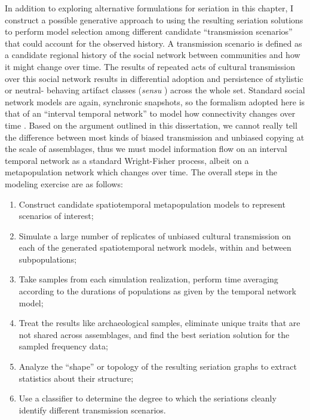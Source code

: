 In addition to exploring alternative formulations for seriation in this chapter, I construct a possible generative approach to using the resulting seriation solutions to perform model selection among different candidate “transmission scenarios” that could account for the observed history.  A transmission scenario is defined as a candidate regional history of the social network between communities and how it might change over time. The results of repeated acts of cultural transmission over this social network results in differential adoption and persistence of stylistic or neutral- behaving artifact classes (\emph{sensu} \citealt{Dunnell1978}) across the whole set. Standard social network models are again, synchronic snapshots, so the formalism adopted here is that of an “interval temporal network” to model how connectivity changes over time \citep{Holme2012}. Based on the argument outlined in this dissertation, we cannot really tell the difference between most kinds of biased transmission and unbiased copying at the scale of assemblages, thus we must model information flow on an interval temporal network as a standard Wright-Fisher process, albeit on a metapopulation network which changes over time. The overall steps in the modeling exercise are as follows:

\begin{enumerate}
    \item Construct candidate spatiotemporal metapopulation models to represent scenarios of interest;
    \item Simulate a large number of replicates of unbiased cultural transmission on each of the generated spatiotemporal network models, within and between subpopulations;
    \item Take samples from each simulation realization, perform time averaging according to the durations of populations as given by the temporal network model;
    \item Treat the results like archaeological samples, eliminate unique traits that are not shared across assemblages, and find the best seriation solution for the sampled frequency data;
    \item Analyze the ``shape'' or topology of the resulting seriation graphs to extract statistics about their structure;
    \item Use a classifier to determine the degree to which the seriations cleanly identify different transmission scenarios.
\end{enumerate}

